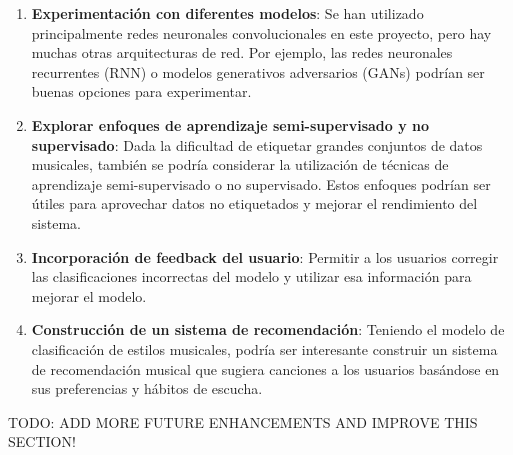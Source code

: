 \begin{enumerate}
\item \textbf{Experimentación con diferentes modelos}: Se han utilizado principalmente redes neuronales convolucionales en este proyecto, pero hay muchas otras arquitecturas de red. Por ejemplo, las redes neuronales recurrentes (RNN) o modelos generativos adversarios (GANs) podrían ser buenas opciones para experimentar.

\item \textbf{Explorar enfoques de aprendizaje semi-supervisado y no supervisado}: Dada la dificultad de etiquetar grandes conjuntos de datos musicales, también se podría considerar la utilización de técnicas de aprendizaje semi-supervisado o no supervisado. Estos enfoques podrían ser útiles para aprovechar datos no etiquetados y mejorar el rendimiento del sistema.

\item \textbf{Incorporación de feedback del usuario}: Permitir a los usuarios corregir las clasificaciones incorrectas del modelo y utilizar esa información para mejorar el modelo.

\item \textbf{Construcción de un sistema de recomendación}: Teniendo el modelo de clasificación de estilos musicales, podría ser interesante construir un sistema de recomendación musical que sugiera canciones a los usuarios basándose en sus preferencias y hábitos de escucha.
\end{enumerate}

TODO: ADD MORE FUTURE ENHANCEMENTS AND IMPROVE THIS SECTION!